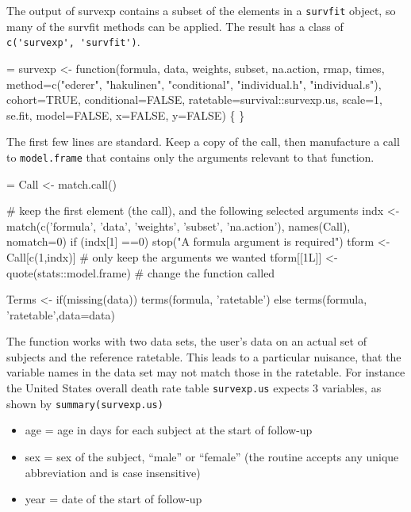 \documentclass{article}
\begin{document}
The output of survexp contains a subset of the elements in a \Verb!survfit!
object, so many of the survfit methods can be applied.  The result
has a class of \Verb!c('survexp', 'survfit')!. 
\begin{nwchunk}
=
 survexp <- function(formula, data,
         weights, subset, na.action, rmap, times,
         method=c("ederer", "hakulinen", "conditional", "individual.h", 
                  "individual.s"),
         cohort=TRUE,  conditional=FALSE,
         ratetable=survival::survexp.us, scale=1, se.fit,
         model=FALSE, x=FALSE, y=FALSE) \{
 \}
\end{nwchunk}


The first few lines are standard.  Keep a copy of the call, then manufacture
a call to \Verb!model.frame! that contains only the arguments relevant to that
function.
\begin{nwchunk}
=
 Call <- match.call()
     
 # keep the first element (the call), and the following selected arguments
 indx <- match(c('formula', 'data', 'weights', 'subset', 'na.action'),
                   names(Call), nomatch=0)
 if (indx[1] ==0) stop("A formula argument is required")
 tform <- Call[c(1,indx)]  # only keep the arguments we wanted
 tform[[1L]] <- quote(stats::model.frame)  # change the function called
     
 Terms <- if(missing(data)) terms(formula, 'ratetable')
          else              terms(formula, 'ratetable',data=data)
\end{nwchunk}

The function works with two data sets, the user's data on an actual set of %
subjects and the reference ratetable.  
This leads to a particular nuisance, that the variable names in the data
set may not match those in the ratetable.  
For instance the United States overall death rate table \Verb!survexp.us! expects
3 variables, as shown by \Verb!summary(survexp.us)!
\begin{itemize}
  \item age = age in days for each subject at the start of follow-up
  \item sex = sex of the subject, ``male'' or ``female'' (the routine accepts
    any unique abbreviation and is case insensitive)
  \item year = date of the start of follow-up
    \end{itemize}
\end{document}
